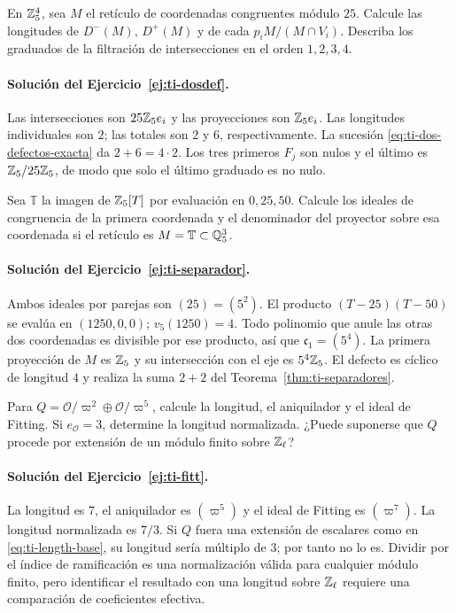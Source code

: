\begin{ejercicio}\label{ej:ti-dosdef}
En $\mathbb{Z}_5^4$, sea $M$ el retículo de coordenadas congruentes
módulo $25$. Calcule las longitudes de $D^-(M)$, $D^+(M)$
y de cada $p_iM/(M\cap V_i)$. Describa los graduados de la
filtración de intersecciones en el orden $1,2,3,4$.
\end{ejercicio}
\paragraph{Solución del Ejercicio~\ref{ej:ti-dosdef}.}
Las intersecciones son $25\mathbb{Z}_5e_i$ y las proyecciones son
$\mathbb{Z}_5e_i$. Las longitudes individuales son $2$; las totales
son $2$ y $6$, respectivamente. La sucesión
\eqref{eq:ti-dos-defectos-exacta} da $2+6=4\cdot2$.
Los tres primeros $F_j$ son nulos y el último es
$\mathbb{Z}_5/25\mathbb{Z}_5$, de modo que solo el último graduado es no nulo.

\begin{ejercicio}\label{ej:ti-separador}
Sea $\mathbb T$ la imagen de $\mathbb{Z}_5[T]$ por evaluación en
$0,25,50$. Calcule los ideales de congruencia de la primera
coordenada y el denominador del proyector sobre esa coordenada
si el retículo es $M=\mathbb T\subset\mathbb{Q}_5^3$.
\end{ejercicio}
\paragraph{Solución del Ejercicio~\ref{ej:ti-separador}.}
Ambos ideales por parejas son $(25)=(5^2)$.
El producto $(T-25)(T-50)$ se evalúa en $(1250,0,0)$;
$v_5(1250)=4$. Todo polinomio que anule las otras dos
coordenadas es divisible por ese producto, así que
$\mathfrak c_1=(5^4)$. La primera proyección de $M$ es
$\mathbb{Z}_5$ y su intersección con el eje es $5^4\mathbb{Z}_5$.
El defecto es cíclico de longitud $4$ y realiza la suma
$2+2$ del Teorema~\ref{thm:ti-separadores}.

\begin{ejercicio}\label{ej:ti-fitt}
Para $Q=\mathcal O/\varpi^2\oplus\mathcal O/\varpi^5$,
calcule la longitud, el aniquilador y el ideal de Fitting.
Si $e_{\mathcal O}=3$, determine la longitud normalizada.
¿Puede suponerse que $Q$ procede por extensión de un módulo
finito sobre $\mathbb{Z}_\ell$?
\end{ejercicio}
\paragraph{Solución del Ejercicio~\ref{ej:ti-fitt}.}
La longitud es $7$, el aniquilador es $(\varpi^5)$ y
el ideal de Fitting es $(\varpi^7)$. La longitud normalizada
es $7/3$. Si $Q$ fuera una extensión de escalares como en
\eqref{eq:ti-length-base}, su longitud sería múltiplo de $3$;
por tanto no lo es. Dividir por el índice de ramificación es
una normalización válida para cualquier módulo finito, pero
identificar el resultado con una longitud sobre $\mathbb{Z}_\ell$
requiere una comparación de coeficientes efectiva.

